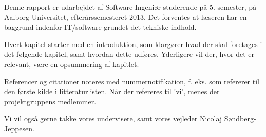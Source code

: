 Denne rapport er udarbejdet af Software-Ingeniør studerende på 5. semester, på Aalborg Universitet, efterårssemesteret 2013.
Det forventes at læseren har en baggrund indenfor IT/software grundet det tekniske indhold.

Hvert kapitel starter med en introduktion, som klargører hvad der skal foretages i det følgende kapitel, samt hvordan dette udføres.
Yderligere vil der, hvor det er relevant, være en opsummering af kapitlet.

Referencer og citationer noteres med nummernotifikation, f. eks. \cite{probabilisticRobotics} som refererer til den første kilde i litteraturlisten.
Når der refereres til 'vi', menes der projektgruppens medlemmer.

Vi vil også gerne takke vores undervisere, samt vores vejleder Nicolaj Søndberg-Jeppesen.